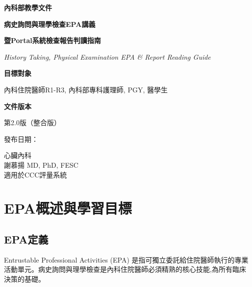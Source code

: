 \documentclass[12pt,a4paper]{article}
\newcommand{\mydate}{\DTMtoday}
\begin{document}
\begin{titlepage}
    \centering
    {\LARGE\textcolor{emergency_red}{\textbf{內科部教學文件}}\par}
    \vspace{1cm}
    {\huge\bfseries 病史詢問與理學檢查EPA講義\par}
    \vspace{0.3cm}
    {\huge\bfseries 暨Portal系統檢查報告判讀指南\par}
    \vspace{0.5cm}
    {\Large\textcolor{emergency_blue}{\textit{History Taking, Physical Examination EPA \& Report Reading Guide}}\par}
    \vspace{1cm}
    
    \begin{tcolorbox}[
        colback=emergency_blue!5!white,
        colframe=emergency_blue,
        width=0.8\textwidth,
        arc=10pt,
        boxrule=1pt
    ]
    \centering
    {\large\textbf{目標對象}\par}
    \vspace{0.3cm}
    內科住院醫師R1-R3, 內科部專科護理師, PGY, 醫學生\par
    \vspace{0.5cm}
    {\large\textbf{文件版本}\par}
    \vspace{0.3cm}
    第2.0版（整合版）\par
    發布日期：\mydate\par
    \end{tcolorbox}

    \vfill
    
    {\large 心臟內科 \\謝慕揚 MD, PhD, FESC\\
    適用於CCC評量系統\par}
    
    \vspace{0.5cm}
\end{titlepage}

\newpage
\tableofcontents
\newpage

\section{EPA概述與學習目標}

\subsection{EPA定義}
Entrustable Professional Activities (EPA) 是指可獨立委託給住院醫師執行的專業活動單元。病史詢問與理學檢查是內科住院醫師必須精熟的核心技能,為所有臨床決策的基礎。
\end{document}
